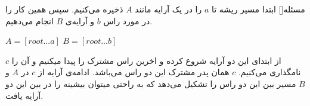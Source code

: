 
‌مسئله[]
ابتدا مسیر ریشه تا $a$ را در یک آرایه مانند $A$ ذخیره می‌کنیم. سپس همین کار را در مورد راس $b$ و آرایه‌ی $B$ انجام می‌دهیم.

\begin{center}
$A = [root ... a]$
$B = [root ... b]$
\end{center}

از ابتدای این دو آرایه شروع کرده و اخرین راس مشترک را پیدا میکنیم و آن را $c$ نامگذاری می‌کنیم. $c$ همان پدر مشترک این دو راس می‌باشد. ادامه‌ی آرایه از $c$ در $A$ و $B$ مسیر بین این دو راس را تشکیل می‌دهد که به راحتی میتوان بیشینه را در بین این دو آرایه یافت.












